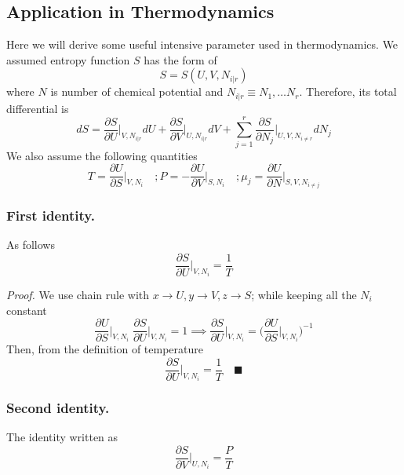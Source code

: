 \documentclass[../../../Main.tex]{subfiles}
\begin{document}
\subsection{Application in Thermodynamics}
Here we will derive some useful intensive parameter used in thermodynamics. We assumed entropy function $S$ has the form of 
\begin{equation*}
    S=S(U, V, N_{i|r} )
\end{equation*}
where $N$ is number of chemical potential and $N_{i|r}\equiv N_1,\dots N_r$. Therefore, its total differential is 
\begin{equation*}
    dS=\frac{\partial S}{\partial U}\bigg|_{V, N_{i|r} }dU + \frac{\partial S}{ \partial V}\bigg|_{U, N_{i|r} }dV +\sum_{j=1}^{r}\frac{\partial S}{ \partial N_j}\bigg|_{U,V, N_{i\neq r} }dN_j
\end{equation*}
We also assume the following quantities
\begin{equation*}
    T=\frac{\partial U}{\partial S}\bigg|_{V, N_{i} }\quad
    ;P=-\frac{\partial U}{\partial V}\bigg|_{S, N_{i} }\quad
    ;\mu_j=\frac{\partial U}{\partial N}\bigg|_{S, V, N_{i\neq j} }
\end{equation*}

\subsubsection{First identity.} As follows
\begin{equation*}
    \frac{\partial S}{\partial U}\bigg|_{V, N_i}=\frac{1}{T}
\end{equation*}

\emph{Proof.} We use chain rule with $x\rightarrow U,  y \rightarrow V ,z \rightarrow S$; while keeping all the $N_i$ constant
\begin{equation*}
    \frac{\partial U}{\partial S}\bigg|_{V,N_i}\;\frac{\partial S}{\partial U}\bigg|_{V,N_i}=1\implies
    \frac{\partial S}{\partial U}\bigg|_{V,N_i}=\biggl(\frac{\partial U}{\partial S}\bigg|_{V,N_i}\biggr)^{-1}
\end{equation*}
Then, from the definition of temperature
\begin{equation*}
    \frac{\partial S}{\partial U}\bigg|_{V,N_i}=\frac{1}{T}\quad \blacksquare
\end{equation*}

\subsubsection{Second identity.} The identity written as
\begin{equation*}
    \frac{\partial S}{\partial V}\bigg|_{U, N_i}=\frac{P}{T}
\end{equation*}
\end{document}
